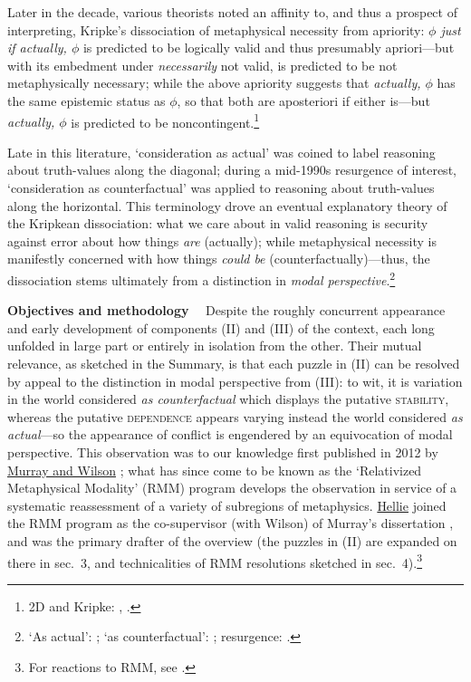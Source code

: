 \documentclass[12pt]{article}
\begin{document}
Later in the decade, various theorists noted an affinity to, and thus a
prospect of interpreting, Kripke's dissociation of metaphysical necessity from
apriority: \emph{$\phi$ just if actually, $\phi$} is predicted to be logically
valid and thus presumably apriori---but with its embedment under
\emph{necessarily} not valid, is predicted to be not metaphysically necessary;
while the above apriority suggests that \emph{actually, $\phi$} has the same
epistemic status as $\phi$, so that both are aposteriori if either is---but
\emph{actually, $\phi$} is predicted to be noncontingent.\footnote{2D and
Kripke: \citep[pp.~172--3]{lewis75ll},
\citep{kaplan77,stalnaker78,Evans1979-EVARAC,davieshumberstone81}.}

Late in this literature, `consideration as actual' was coined to label
reasoning about truth-values along the diagonal; during a mid-1990s resurgence
of interest, `consideration as counterfactual' was applied to reasoning about
truth-values along the horizontal. This terminology drove an eventual
explanatory theory of the Kripkean dissociation: what we care about in valid
reasoning is security against error about how things \emph{are} (actually);
while metaphysical necessity is manifestly concerned with how things
\emph{could be} (counterfactually)---thus, the dissociation stems ultimately
from a distinction in \emph{modal perspective}.\footnote{`As actual':
\citep{davieshumberstone81}; `as counterfactual':
\citep{chalmers96,jackson98}; resurgence:
\citep{jackson94,lewis94,blockstalnaker99,stalnaker01,chalmersosi,chalmersf2ds,gendlerhawthorne02}.} 

\bigskip{}

\noindent \textbf{Objectives and methodology} \, \,  Despite the roughly concurrent
appearance and early development of components (II) and (III) of the context,
each long unfolded in large part or entirely in isolation from the other.
Their mutual relevance, as sketched in the Summary, is that each puzzle in
(II) can be resolved by appeal to the distinction in modal perspective from
(III): to wit, it is variation in the world considered \emph{as
counterfactual} which displays the putative \textsc{stability}, whereas the
putative \textsc{dependence} appears varying instead the world considered
\emph{as actual}---so the appearance of conflict is engendered by an
equivocation of modal perspective. This observation was to our knowledge first published in
2012 by \ul{Murray and Wilson} 
\citep{murraywilson12}; what has since come to be known as the `Relativized
Metaphysical Modality' (RMM) program develops the observation in service of a
systematic reassessment of a variety of subregions of metaphysics. \ul{Hellie} 
joined the RMM program as the co-supervisor (with Wilson) of Murray's dissertation
\citep{murray17}, and was the primary drafter of the overview \citep{hmw} (the
puzzles in (II) are expanded on there in sec.~3, and technicalities of RMM
resolutions sketched in sec.~4).\footnote{For reactions to RMM, see
\citep{yagisawa,Clarke-Doane2019-CLAMAA-14,LamForthcoming-LAMAIP-2,Bassford2020-BASART-3,Glazier2017-GLATDB-3,
Teitel2019-TEICEA,Furtado2020-FURSAT,Roberts2020-ROBTMA-11,Dorr2021-DORTBO-2}.} 
\end{document}
